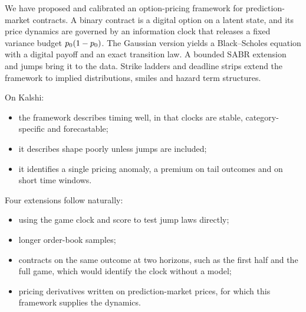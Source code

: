 We have proposed and calibrated an option-pricing framework for prediction-market contracts. A
binary contract is a digital option on a latent state, and its price dynamics are governed by an
information clock that releases a fixed variance budget $p_0(1-p_0)$. The Gaussian version
yields a Black--Scholes equation with a digital payoff and an exact transition law. A bounded SABR
extension and jumps bring it to the data. Strike ladders and deadline strips extend the framework
to implied distributions, smiles and hazard term structures.

On Kalshi:
\begin{itemize}
  \item the framework describes timing well, in that clocks are stable, category-specific and
  forecastable;
  \item it describes shape poorly unless jumps are included;
  \item it identifies a single pricing anomaly, a premium on tail outcomes and on short time
  windows.
\end{itemize}

Four extensions follow naturally:
\begin{itemize}
  \item using the game clock and score to test jump laws directly;
  \item longer order-book samples;
  \item contracts on the same outcome at two horizons, such as the first half and the full game,
  which would identify the clock without a model;
  \item pricing derivatives written on prediction-market prices, for which this framework supplies
  the dynamics.
\end{itemize}
